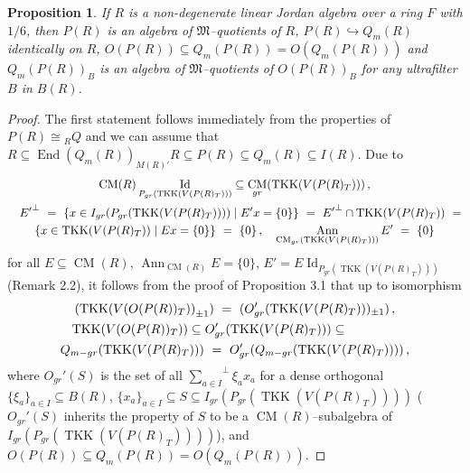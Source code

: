\documentclass[a4paper,11pt]{article}
\newtheorem{prop}[defi]{Proposition}
\DeclareMathOperator{\Id}{Id}
\DeclareMathOperator{\End}{End}
\DeclareMathOperator{\CM}{CM}
\DeclareMathOperator{\Ann}{Ann}
\DeclareMathOperator{\TKK}{TKK}
\begin{document}
\begin{prop}
If $R$ is a non-degenerate linear Jordan algebra over a ring $F$ with $1/6$, 
\linebreak then $P(R)$ is an algebra of $\mathfrak{M}$--quotients of $R$, 
${P(R)\hookrightarrow Q_m(R)}$ identically on $R$,
$O(P(R))\subseteq Q_m(P(R))=O(Q_m(P(R)))$ and $Q_m(P(R))_B$ is an algebra 
of $\mathfrak{M}$--quotients of $O(P(R))_B$ for any ultrafilter $B$ in 
$B(R)$. 
\end{prop}

\begin{proof}
The first statement follows immediately from the properties of 
${P(R)\cong {}_R Q}$ and we can assume that 
${R\subseteq \End(Q_m(R))_{M(R)'} R\subseteq P(R)\subseteq 
Q_m(R)\subseteq I(R)}$. Due to 
\begin{multline*}
\CM(R) \Id_{P_{gr}(\TKK(V(P(R)_T)))}\subseteq \CM_{gr}(\TKK(V(P(R)_T)))\,,
\\
\shoveleft{
{E'}^{\perp}\ =\ \{x\in I_{gr}(P_{gr}(\TKK(V(P(R)_T))))\mid E' x=\{0\}\}\ =\ 
{E'}^{\perp}\cap \TKK(V(P(R)_T))\ =}
\\ 
\{x\in \TKK(V(P(R)_T))\mid E x=\{0\}\}\ =\ \{0\}\,,\quad 
\Ann_{\CM_{gr}(\TKK(V(P(R)_T)))} E'\ =\ \{0\}
\end{multline*}
for all ${E\subseteq \CM(R)}$, ${\Ann_{\CM(R)} E=\{0\}}$, 
${E'=E \Id_{P_{gr}(\TKK(V(P(R)_T)))}}$ (Remark 2.2),
it follows from the proof of Proposition 3.1 that up to isomorphism 
\begin{multline*}
({\TKK(V(O(P(R))_T))}_{\pm 1})\ =\ 
(O_{gr}'(\TKK(V(P(R)_T)))_{\pm 1})\,,
\\
\shoveleft{\TKK(V(O(P(R))_T))\subseteq O_{gr}'(\TKK(V(P(R)_T)))\subseteq}
\\ 
Q_{m-gr}(\TKK(V(P(R)_T)))\ =\ O_{gr}'(Q_{m-gr}(\TKK(V(P(R)_T))))\,,
\end{multline*}
where $O_{gr}'(S)$ is the set of all 
${{\sum\limits_{a\in I}}^{\perp} \xi_a x_a}$ for a dense orthogonal 
${\{\xi_a\}_{a\in I}\subseteq B(R)}$, $\{x_a\}_{a\in I}\subseteq S
\subseteq I_{gr}(P_{gr}(\TKK(V(P(R)_T))))$ 
($O_{gr}'(S)$ inherits the property of $S$ to be a $\CM(R)$--subalgebra of 
$I_{gr}(P_{gr}(\TKK(V(P(R)_T))))$), 
and ${O(P(R))\subseteq Q_m(P(R))=O(Q_m(P(R)))}$.


\end{proof}
\end{document}
